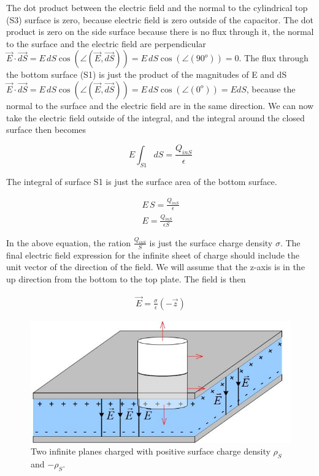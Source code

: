 \documentclass{ximera}
\begin{document}
The dot product between the electric field and the normal to the cylindrical top (S3) surface is zero, because electric field is zero outside of the capacitor. The dot product is zero on the side surface because there is no flux through it, the normal to the surface and the electric field are perpendicular $\vec{E} \cdot \vec{dS}= E \,dS  \cos(\angle(\vec{E},\vec{dS}))= E \,dS  \cos(\angle(90^o)) =0$. The flux through the bottom surface (S1) is just the product of the magnitudes of E and dS $\vec{E} \cdot \vec{dS}= E \,dS  \cos(\angle(\vec{E},\vec{dS}))= E \,dS  \cos(\angle(0^o)) =E dS$, because the normal to the surface and the electric field are in the same direction. We can now take the electric field outside of the integral,   and the integral around the closed surface then becomes
 
 

\begin{equation}
E \int_{S1} dS  = \frac{Q_{inS}}{\epsilon}
\end{equation}

 The integral of surface S1  is just the surface area of the bottom surface.
 
\begin{eqnarray}
E \, S = \frac{Q_{inS}}{\epsilon} \\
 E=\frac{Q_{inS}}{ \epsilon S}
\end{eqnarray}

In the above equation, the ration $\frac{Q_{inS}}{S}$ is just the surface charge density $\sigma$. The final electric field expression for the infinite sheet of charge should include the unit vector of the direction of the field. We will assume that the z-axis is in the up direction from the bottom to the top plate. The field is then

\begin{eqnarray}
 \vec{E}  = \frac{\sigma}{ \epsilon } (-\vec{z})
\end{eqnarray}




\begin{figure}[htbp]
\begin{center}
\includegraphics[scale=0.8]{../jpg/Parallel_Plate_Capacitor2.jpg}
\end{center}
\caption{Two infinite planes charged with positive surface charge density $\rho_S$ and $-\rho_S.$}
\label{fig:ParallePlateCapacitorGauss}
\end{figure}
\end{document}
